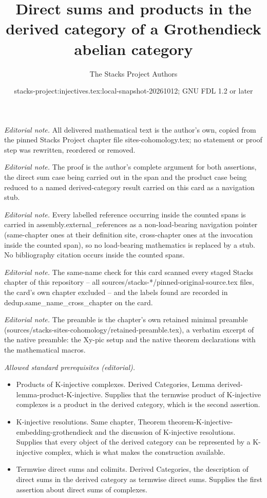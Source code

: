 \documentclass[10pt,a4paper]{amsart}
\title{Direct sums and products in the derived category of a Grothendieck abelian category}
\author{The Stacks Project Authors}
\date{stacks-project:injectives.tex:local-snapshot-20261012; GNU FDL 1.2 or later}
\theoremstyle{plain}
\theoremstyle{definition}
\theoremstyle{remark}
\numberwithin{equation}{subsection}
\begin{document}
\maketitle
\noindent\textit{Editorial note.} All delivered mathematical text is the author's own, copied from the pinned Stacks Project chapter file sites-cohomology.tex; no statement or proof step was rewritten, reordered or removed.\par\medskip
\noindent\textit{Editorial note.} The proof is the author's complete argument for both assertions, the direct sum case being carried out in the span and the product case being reduced to a named derived-category result carried on this card as a navigation stub.\par\medskip
\noindent\textit{Editorial note.} Every labelled reference occurring inside the counted spans is carried in assembly.external\_references as a non-load-bearing navigation pointer (same-chapter ones at their definition site, cross-chapter ones at the invocation inside the counted span), so no load-bearing mathematics is replaced by a stub. No bibliography citation occurs inside the counted spans.\par\medskip
\noindent\textit{Editorial note.} The same-name check for this card scanned every staged Stacks chapter of this repository -- all sources/stacks-*/pinned-original-source.tex files, the card's own chapter excluded -- and the labels found are recorded in dedup.same\_name\_cross\_chapter on the card.\par\medskip
\noindent\textit{Editorial note.} The preamble is the chapter's own retained minimal preamble (sources/stacks-sites-cohomology/retained-preamble.tex), a verbatim excerpt of the native preamble: the Xy-pic setup and the native theorem declarations with the mathematical macros.\par\medskip
\noindent\textit{Allowed standard prerequisites (editorial).}\begin{itemize}
\item Products of K-injective complexes. Derived Categories, Lemma derived-lemma-product-K-injective. Supplies that the termwise product of K-injective complexes is a product in the derived category, which is the second assertion.
\item K-injective resolutions. Same chapter, Theorem theorem-K-injective-embedding-grothendieck and the discussion of K-injective resolutions. Supplies that every object of the derived category can be represented by a K-injective complex, which is what makes the construction available.
\item Termwise direct sums and colimits. Derived Categories, the description of direct sums in the derived category as termwise direct sums. Supplies the first assertion about direct sums of complexes.
\end{itemize}\medskip
\end{document}
